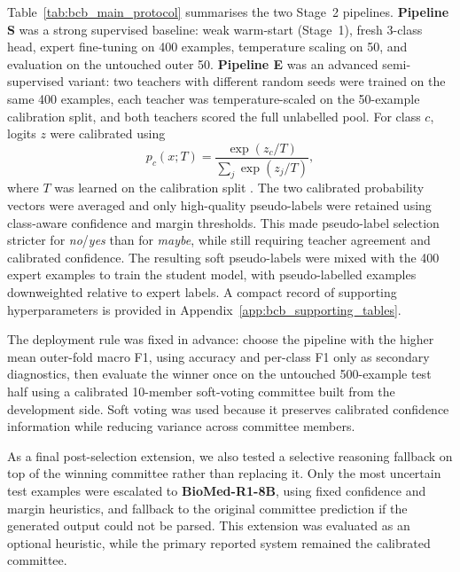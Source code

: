 \documentclass{article}
\begin{document}
Table~\ref{tab:bcb_main_protocol} summarises the two Stage~2 pipelines. \textbf{Pipeline S} was a strong supervised baseline: weak warm-start (Stage~1), fresh 3-class head, expert fine-tuning on 400 examples, temperature scaling on 50, and evaluation on the untouched outer 50. \textbf{Pipeline E} was an advanced semi-supervised variant: two teachers with different random seeds were trained on the same 400 examples, each teacher was temperature-scaled on the 50-example calibration split, and both teachers scored the full unlabelled pool. For class $c$, logits $z$ were calibrated using
\[
p_c(x;T)=\frac{\exp(z_c/T)}{\sum_j \exp(z_j/T)},
\]
where $T$ was learned on the calibration split \citep{Guo2017}. The two calibrated probability vectors were averaged and only high-quality pseudo-labels were retained using class-aware confidence and margin thresholds. This made pseudo-label selection stricter for \textit{no}/\textit{yes} than for \textit{maybe}, while still requiring teacher agreement and calibrated confidence. The resulting soft pseudo-labels were mixed with the 400 expert examples to train the student model, with pseudo-labelled examples downweighted relative to expert labels. A compact record of supporting hyperparameters is provided in Appendix~\ref{app:bcb_supporting_tables}.

The deployment rule was fixed in advance: choose the pipeline with the higher mean outer-fold macro F1, using accuracy and per-class F1 only as secondary diagnostics, then evaluate the winner once on the untouched 500-example test half using a calibrated 10-member soft-voting committee built from the development side. Soft voting was used because it preserves calibrated confidence information while reducing variance across committee members.

As a final post-selection extension, we also tested a selective reasoning fallback on top of the winning committee rather than replacing it. Only the most uncertain test examples were escalated to \textbf{BioMed-R1-8B}, using fixed confidence and margin heuristics,  and fallback to the original committee prediction if the generated output could not be parsed. This extension was evaluated as an optional heuristic, while the primary reported system remained the calibrated committee.
\end{document}
